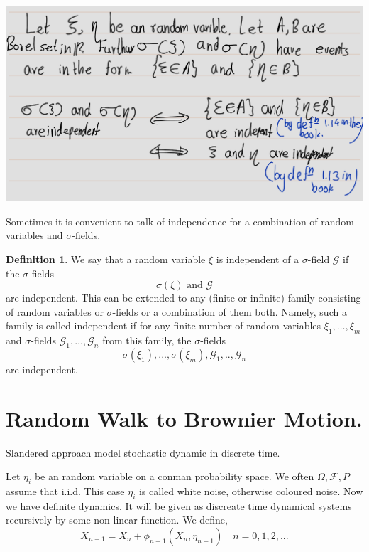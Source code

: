 \documentclass[
]{book}
\theoremstyle{definition}
\newtheorem{definition}{Definition}[chapter]
\theoremstyle{definition}
\theoremstyle{definition}
\theoremstyle{definition}
\theoremstyle{remark}
\begin{document}
\includegraphics[width=18cm,height=\textheight]{fig/fig ex1.12.png}

Sometimes it is convenient to talk of independence for a combination of random variables and \(\sigma\)-fields.

\begin{definition}
\protect\hypertarget{def:unnamed-chunk-36}{}\label{def:unnamed-chunk-36}We say that a random variable \(\xi\) is independent of a \(\sigma\)-field \(\mathcal{G}\) if the \(\sigma\)-fields \[ \sigma(\xi) \text{ and } \mathcal{G} \] are independent. This can be extended to any (finite or infinite) family consisting of random variables or \(\sigma\)-fields or a combination of them both. Namely, such a family is called independent if for any finite number of random variables \(\xi_1, \ldots, \xi_m\) and \(\sigma\)-fields \(\mathcal{G}_1, \ldots, \mathcal{G}_n\) from this family, the \(\sigma\)-fields
\[\sigma(\xi_1),...,\sigma(\xi_m),\mathcal{G}_1,..,\mathcal{G}_n\]
are independent.
\end{definition}

\chapter{Random Walk to Brownier Motion.}\label{random-walk-to-brownier-motion.}

Slandered approach model stochastic dynamic in discrete time.

Let \(\eta_i\) be an random variable on a conman probability space.
We often \(\Omega,\mathcal{F},P\) assume that i.i.d. This case \(\eta _i\) is called white noise, otherwise coloured noise.
Now we have definite dynamics. It will be given as discreate time dynamical systems recursively by some non linear function.
We define,
\begin{equation}
X_{n+1}=X_n+\phi_{n+1}(X_n,\eta_{n+1}) \quad n=0,1,2,...\label{eq:1}
\end{equation}
\end{document}
